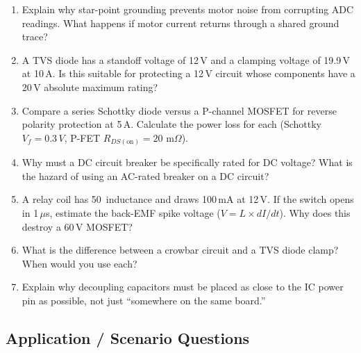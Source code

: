 \documentclass[11pt,letterpaper,twoside,openany]{book}
\newcommand{\mohm}{\,\text{m}\Omega}
\begin{document}
\begin{enumerate}[leftmargin=1.5em]
  \item Explain why star-point grounding prevents motor noise from corrupting ADC readings. What happens if motor current returns through a shared ground trace?

  \item A TVS diode has a standoff voltage of 12\,V and a clamping voltage of 19.9\,V at 10\,A. Is this suitable for protecting a 12\,V circuit whose components have a 20\,V absolute maximum rating?

  \item Compare a series Schottky diode versus a P-channel MOSFET for reverse polarity protection at 5\,A. Calculate the power loss for each (Schottky $V_f = 0.3\,V$, P-FET $R_{DS(\text{on})} = 20\,\mohm$).

  \item Why must a DC circuit breaker be specifically rated for DC voltage? What is the hazard of using an AC-rated breaker on a DC circuit?

  \item A relay coil has 50\, inductance and draws 100\,mA at 12\,V. If the switch opens in 1\,$\mu$s, estimate the back-EMF spike voltage ($V = L \times dI/dt$). Why does this destroy a 60\,V MOSFET?

  \item What is the difference between a crowbar circuit and a TVS diode clamp? When would you use each?

  \item Explain why decoupling capacitors must be placed as close to the IC power pin as possible, not just ``somewhere on the same board.''
\end{enumerate}

\subsection{Application / Scenario Questions}
\end{document}
